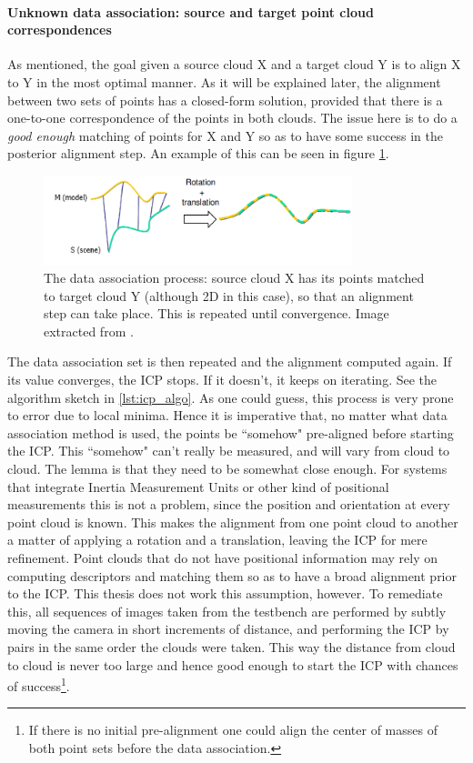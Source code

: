 \documentclass[../main.tex]{subfiles}
\begin{document}
\paragraph{Unknown data association: source and target point cloud correspondences}
As mentioned, the goal given a source cloud X and a target cloud Y is to align X to Y in the most optimal manner. As it will be explained later, the alignment between two sets of points has a closed-form solution, provided that there is a one-to-one correspondence of the points in both clouds. The issue here is to do a \emph{good enough} matching of points for X and Y so as to have some success in the posterior alignment step. An example of this can be seen in figure \ref{fig:icp_demo}. 

\begin{figure}[htbp]
    \centering
    \includegraphics[width=0.8\textwidth]{images/icp_demo.png}
    \caption{The data association process: source cloud X has its points matched to target cloud Y (although 2D in this case), so that an alignment step can take place. This is repeated until convergence. Image extracted from \cite{icp_demo_figure}.}
    \label{fig:icp_demo}
\end{figure}

The data association set is then repeated and the alignment computed again. If its value converges, the ICP stops. If it doesn't, it keeps on iterating. See the algorithm sketch in \ref{lst:icp_algo}. As one could guess, this process is very prone to error due to local minima. Hence it is imperative that, no matter what data association method is used, the points be ``somehow" pre-aligned before starting the ICP. This ``somehow" can't really be measured, and will vary from cloud to cloud. The lemma is that they need to be somewhat close enough. For systems that integrate Inertia Measurement Units or other kind of positional measurements this is not a problem, since the position and orientation at every point cloud is known. This makes the alignment from one point cloud to another a matter of applying a rotation and a translation, leaving the ICP for mere refinement. Point clouds that do not have positional information may rely on computing descriptors and matching them so as to have a broad alignment prior to the ICP. This thesis does not work this assumption, however. To remediate this, all sequences of images taken from the testbench are performed by subtly moving the camera in short increments of distance, and performing the ICP by pairs in the same order the clouds were taken. This way the distance from cloud to cloud is never too large and hence good enough to start the ICP with chances of success\footnote{If there is no initial pre-alignment one could align the center of masses of both point sets before the data association.}.
\end{document}
